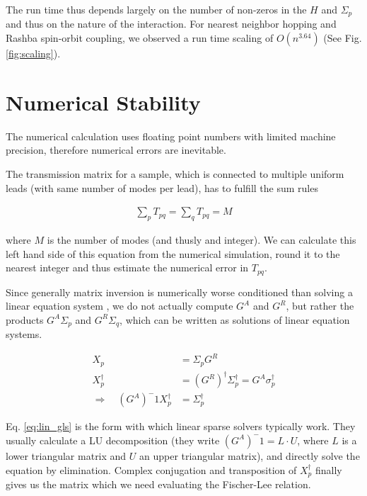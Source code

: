 The run time thus depends largely on the number of non-zeros in the $H$ and
$\Sigma_p$ and thus on the nature of the interaction. For nearest neighbor
hopping and Rashba spin-orbit coupling, we observed a run time scaling of
$O(n^{3.64})$ (See Fig. \ref{fig:scaling}).

\section{Numerical Stability}

The numerical
calculation uses floating point numbers with limited machine precision,
therefore numerical errors are inevitable.

The transmission matrix for a sample, which is connected to multiple uniform
leads (with same number of modes per lead), has to fulfill the sum rules

\begin{align}
    \sum_p T_{pq} = \sum_q T_{pq} = M
    \label{eq:sumrule}
\end{align}

where $M$ is the number of modes (and thusly and integer). We can calculate
this left hand side of this equation from the numerical simulation, round it
to the nearest integer and thus estimate the numerical error in $T_{pq}$.

Since generally matrix inversion is numerically worse conditioned than solving
a linear equation system \cite{matrixinversion}, we do not actually compute
$G^A$ and $G^R$, but rather the products $G^A\Sigma_p$ and $G^R\Sigma_q$,
which can be written as solutions of linear equation systems.

\begin{align}
    X_p &= \Sigma_p G^R\\
    X_p^\dagger &= (G^R)^\dagger \Sigma_p^\dagger = G^A \sigma_p^\dagger\\
    \Rightarrow\quad (G^A)^-1 X_p^\dagger &= \Sigma_p^\dagger
    \label{eq:lin_gls}
\end{align}

Eq. \ref{eq:lin_gls} is the form with which linear sparse solvers typically
work. They usually calculate a LU decomposition (they write
$(G^A)^-1 = L \cdot U$, where $L$ is a lower triangular matrix and $U$ an
upper triangular matrix), and directly solve the equation by elimination.
Complex conjugation and transposition of $X_p^\dagger$ finally gives us the
matrix which we need evaluating the Fischer-Lee relation.

